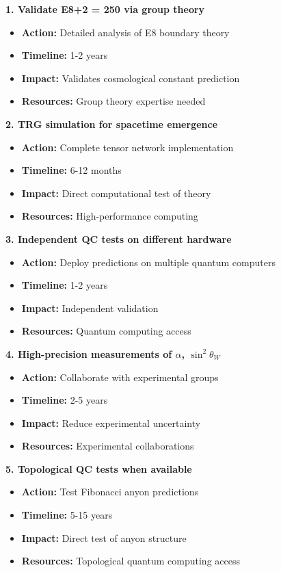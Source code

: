 \documentclass[11pt]{article}
\theoremstyle{definition}
\begin{document}
\textbf{1. Validate E8+2 = 250 via group theory}
\begin{itemize}
\item \textbf{Action:} Detailed analysis of E8 boundary theory
\item \textbf{Timeline:} 1-2 years
\item \textbf{Impact:} Validates cosmological constant prediction
\item \textbf{Resources:} Group theory expertise needed
\end{itemize}

\textbf{2. TRG simulation for spacetime emergence}
\begin{itemize}
\item \textbf{Action:} Complete tensor network implementation
\item \textbf{Timeline:} 6-12 months
\item \textbf{Impact:} Direct computational test of theory
\item \textbf{Resources:} High-performance computing
\end{itemize}

\textbf{3. Independent QC tests on different hardware}
\begin{itemize}
\item \textbf{Action:} Deploy predictions on multiple quantum computers
\item \textbf{Timeline:} 1-2 years
\item \textbf{Impact:} Independent validation
\item \textbf{Resources:} Quantum computing access
\end{itemize}

\textbf{4. High-precision measurements of $\alpha$, $\sin^2\theta_W$}
\begin{itemize}
\item \textbf{Action:} Collaborate with experimental groups
\item \textbf{Timeline:} 2-5 years
\item \textbf{Impact:} Reduce experimental uncertainty
\item \textbf{Resources:} Experimental collaborations
\end{itemize}

\textbf{5. Topological QC tests when available}
\begin{itemize}
\item \textbf{Action:} Test Fibonacci anyon predictions
\item \textbf{Timeline:} 5-15 years
\item \textbf{Impact:} Direct test of anyon structure
\item \textbf{Resources:} Topological quantum computing access
\end{itemize}
\end{document}
